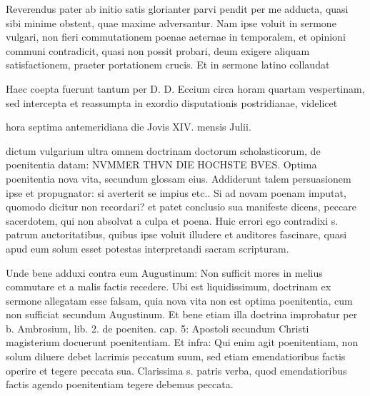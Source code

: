 Reverendus pater ab initio satis glorianter parvi pendit per me adducta, quasi sibi minime obstent, quae maxime adversantur. Nam ipse voluit in sermone vulgari, non fieri commutationem poenae aeternae in temporalem, et opinioni communi contradicit, quasi non possit probari, deum exigere aliquam satisfactionem, praeter portationem crucis. Et in sermone latino collaudat

Haec coepta fuerunt tantum per D. D. Eccium circa horam quartam vespertinam, sed intercepta et reassumpta in exordio disputationis postridianae, videlicet

hora septima antemeridiana die Jovis XIV. mensis Julii.

dictum vulgarium ultra omnem doctrinam doctorum scholasticorum, de poenitentia datam: NVMMER THVN DIE HOCHSTE BVES. Optima poenitentia nova vita, secundum glossam eius. Addiderunt talem persuasionem ipse et propugnator: si averterit se impius etc.. Si ad novam poenam imputat, quomodo dicitur non recordari? et patet conclusio sua manifeste dicens, peccare sacerdotem, qui non absolvat a culpa et poena. Huic errori ego contradixi s. patrum auctoritatibus, quibus ipse voluit illudere et auditores fascinare, quasi apud eum solum esset potestas interpretandi sacram scripturam.

Unde bene adduxi contra eum Augustinum: Non sufficit mores in melius commutare et a malis factis recedere. Ubi est liquidissimum, doctrinam ex sermone allegatam esse falsam, quia nova vita non est optima poenitentia, cum non sufficiat secundum Augustinum. Et bene etiam illa doctrina improbatur per b. Ambrosium, lib. 2. de poeniten. cap. 5: Apostoli secundum Christi magisterium docuerunt poenitentiam. Et infra: Qui enim agit poenitentiam, non solum diluere debet lacrimis peccatum suum, sed etiam emendatioribus factis operire et tegere peccata sua. Clarissima s. patris verba, quod emendatioribus factis agendo poenitentiam tegere debemus peccata.

